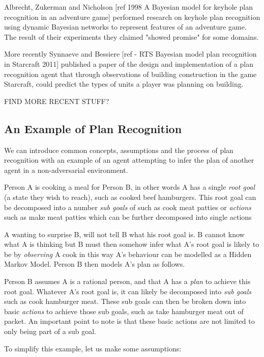 \documentclass[parskip]{cs4rep}
\begin{document}
Albrecht, Zukerman and Nicholson [ref 1998 A Bayesian model for keyhole plan recognition in an adventure game] performed research on keyhole plan recognition using dynamic Bayesian networks to represent features of an adventure game. The result of their experiments they claimed "showed promise" for some domains. 

More recently Synnaeve and Bessiere [ref - RTS Bayesian model plan recognition in Starcraft 2011] published a paper of the design and implementation of a plan recognition agent that through observations of building construction in the game Starcraft, could predict the types of units a player was planning on building.

FIND MORE RECENT STUFF?

\subsection{An Example of Plan Recognition}

We can introduce common concepts, assumptions and the process of plan recognition with an example of an agent attempting to infer the plan of another agent in a non-adversarial environment. 

Person A is cooking a meal for Person B, in other words A has a single \textit{root goal} (a state they wish to reach), such as cooked beef hamburgers. This root goal can be decomposed into a number \textit{sub goals} of such as cook meat patties or \textit{actions} such as make meat patties  which can be further decomposed into single actions

 A wanting to surprise B, will not tell B what his root goal is. B cannot know what A is thinking but B must then somehow infer what A's root goal is likely to be by \textit{observing} A cook in this way A's behaviour can be modelled as a Hidden Markov Model. Person B then models A's plan as follows. 

Person B assumes A is a rational person, and that A has a \textit{plan} to achieve this root goal. Whatever A's root goal is, it can likely be decomposed into \textit{sub goals} such as cook hamburger meat. These sub goals can then be broken down into basic \textit{actions} to achieve those sub goals, such as take hamburger meat out of packet. An important point to note is that these basic actions are not limited to only being part of a sub goal.

To simplify this example, let us make some assumptions:
\end{document}
